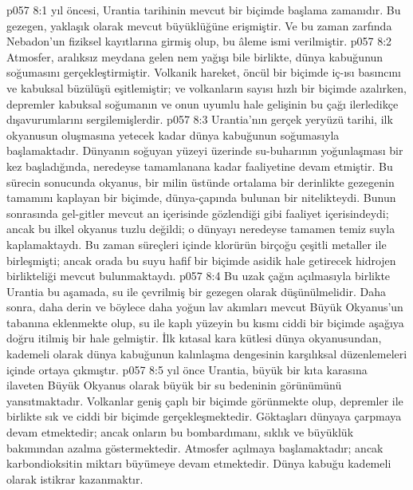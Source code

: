 \vs p057 8:1  yıl öncesi, Urantia tarihinin mevcut bir biçimde başlama zamanıdır. Bu gezegen, yaklaşık olarak mevcut büyüklüğüne erişmiştir. Ve bu zaman zarfında Nebadon’un fiziksel kayıtlarına girmiş olup, bu âleme  ismi verilmiştir.
\vs p057 8:2 Atmosfer, aralıksız meydana gelen nem yağışı bile birlikte, dünya kabuğunun soğumasını gerçekleştirmiştir. Volkanik hareket, öncül bir biçimde iç\hyp{}ısı basıncını ve kabuksal büzülüşü eşitlemiştir; ve volkanların sayısı hızlı bir biçimde azalırken, depremler kabuksal soğumanın ve onun uyumlu hale gelişinin bu çağı ilerledikçe dışavurumlarını sergilemişlerdir.
\vs p057 8:3 Urantia’nın gerçek yeryüzü tarihi, ilk okyanusun oluşmasına yetecek kadar dünya kabuğunun soğumasıyla başlamaktadır. Dünyanın soğuyan yüzeyi üzerinde su\hyp{}buharının yoğunlaşması bir kez başladığında, neredeyse tamamlanana kadar faaliyetine devam etmiştir. Bu sürecin sonucunda okyanus, bir milin üstünde ortalama bir derinlikte gezegenin tamamını kaplayan bir biçimde, dünya\hyp{}çapında bulunan bir nitelikteydi. Bunun sonrasında gel\hyp{}gitler mevcut an içerisinde gözlendiği gibi faaliyet içerisindeydi; ancak bu ilkel okyanus tuzlu değildi; o dünyayı neredeyse tamamen temiz suyla kaplamaktaydı. Bu zaman süreçleri içinde klorürün birçoğu çeşitli metaller ile birleşmişti; ancak orada bu suyu hafif bir biçimde asidik hale getirecek hidrojen birlikteliği mevcut bulunmaktaydı.
\vs p057 8:4 Bu uzak çağın açılmasıyla birlikte Urantia bu aşamada, su ile çevrilmiş bir gezegen olarak düşünülmelidir. Daha sonra, daha derin ve böylece daha yoğun lav akımları mevcut Büyük Okyanus’un tabanına eklenmekte olup, su ile kaplı yüzeyin bu kısmı ciddi bir biçimde aşağıya doğru itilmiş bir hale gelmiştir. İlk kıtasal kara kütlesi dünya okyanusundan, kademeli olarak dünya kabuğunun kalınlaşma dengesinin karşılıksal düzenlemeleri içinde ortaya çıkmıştır.
\vs p057 8:5  yıl önce Urantia, büyük bir kıta karasına ilaveten Büyük Okyanus olarak büyük bir su bedeninin görünümünü yansıtmaktadır. Volkanlar geniş çaplı bir biçimde görünmekte olup, depremler ile birlikte sık ve ciddi bir biçimde gerçekleşmektedir. Göktaşları dünyaya çarpmaya devam etmektedir; ancak onların bu bombardımanı, sıklık ve büyüklük bakımından azalma göstermektedir. Atmosfer açılmaya başlamaktadır; ancak karbondioksitin miktarı büyümeye devam etmektedir. Dünya kabuğu kademeli olarak istikrar kazanmaktır.
